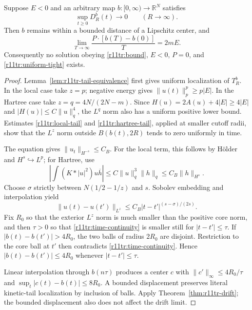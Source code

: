 \begin{theorem}
\label{thm:r11tr-center}
Suppose $E<0$ and an arbitrary map $b:[0,\infty)\to\mathbb R^N$
satisfies
\begin{equation}\label{r11tr:uniform-tight}
 \sup_{t\ge0}D_R^b(t)\longrightarrow0\qquad(R\to\infty).
\end{equation}
Then $b$ remains within a bounded distance of a Lipschitz center,
and
\[
 \lim_{T\to\infty}\frac{P\cdot[b(T)-b(0)]}{T}=2mE.
\]
Consequently no solution obeying \eqref{r11tr:bound},
$E<0$, $P=0$, and \eqref{r11tr:uniform-tight} exists.
\end{theorem}
\begin{proof}
Lemma~\ref{lem:r11tr-tail-equivalence} first gives uniform
localization of $T_R^b$. In the local case take $z=p$; negative
energy gives $\|u(t)\|_p^p\ge p|E|$. In the Hartree case take
$z=q=4N/(2N-m)$. Since
$H(u)=2A(u)+4|E|\ge4|E|$ and
$|H(u)|\le C\|u\|_q^4$, the $L^q$ norm also has a uniform
positive lower bound. Estimates \eqref{r11tr:local-tail} and
\eqref{r11tr:hartree-tail}, applied at smaller cutoff radii,
show that the $L^z$ norm outside $B(b(t),2R)$ tends to zero
uniformly in time.

The equation gives $\|u_t\|_{H^{-s}}\le C_B$. For the local term,
this follows by H\"older and $H^s\hookrightarrow L^p$; for Hartree,
use
\[
 \left|\int(K*|u|^2)u\overline h\right|
 \le C\|u\|_q^3\|h\|_q\le C_B\|h\|_{H^s}.
\]
Choose $\sigma$ strictly between $N(1/2-1/z)$ and $s$.
Sobolev embedding and interpolation yield
\begin{equation}\label{r11tr:time-continuity}
 \|u(t)-u(t')\|_{L^z}
 \le C_B|t-t'|^{(s-\sigma)/(2s)}.
\end{equation}
Fix $R_0$ so that the exterior $L^z$ norm is much smaller than
the positive core norm, and then $\tau>0$ so that
\eqref{r11tr:time-continuity} is smaller still for
$|t-t'|\le\tau$. If $|b(t)-b(t')|>4R_0$, the two balls of
radius $2R_0$ are disjoint. Restriction to the core ball at $t'$
then contradicts \eqref{r11tr:time-continuity}. Hence
$|b(t)-b(t')|\le4R_0$ whenever $|t-t'|\le\tau$.

Linear interpolation through $b(n\tau)$ produces a center $c$
with $\|c'\|_\infty\le4R_0/\tau$ and
$\sup_t|c(t)-b(t)|\le8R_0$. A bounded displacement preserves
literal kinetic-tail localization by inclusion of balls. Apply
Theorem~\ref{thm:r11tr-drift}; the bounded displacement also
does not affect the drift limit.
\end{proof}


